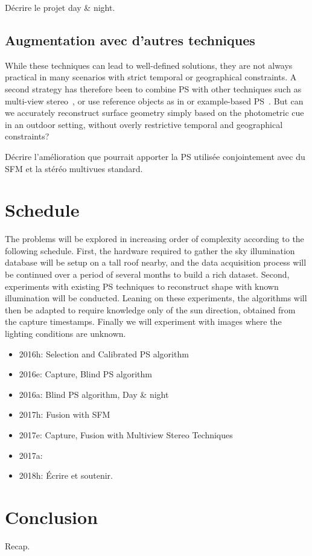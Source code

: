 \documentclass{report}
\begin{document}
Décrire le projet day \& night.

\section{Augmentation avec d'autres techniques}

While these techniques can lead to well-defined solutions, they are not always practical in many scenarios with strict temporal or geographical constraints. A second strategy has therefore been to combine PS with other techniques such as multi-view stereo~\cite{inose-tcva-13,shi-3dv-14}, or use reference objects as in \cite{johnson-cvpr-11} or example-based PS~\cite{hertzmann-pami-05,ackermann-3dv-14}. But can we accurately reconstruct surface geometry simply based on the photometric cue in an outdoor setting, without overly restrictive temporal and geographical constraints?

Décrire l'amélioration que pourrait apporter la PS utilisée conjointement avec du SFM et la stéréo multivues standard.


\chapter{Schedule}

The problems will be explored in increasing order of complexity according to the following schedule. First, the hardware required to gather the sky illumination database will be setup on a tall roof nearby, and the data acquisition process will be continued over a period of several months to build a rich dataset. Second, experiments with existing PS techniques to reconstruct shape with known illumination will be conducted. Leaning on these experiments, the algorithms will then be adapted to require knowledge only of the sun direction, obtained from the capture timestamps. Finally we will experiment with images where the lighting conditions are unknown.

\begin{itemize}
	\item 2016h: Selection and Calibrated PS algorithm
	\item 2016e: Capture, Blind PS algorithm
	\item 2016a: Blind PS algorithm, Day \& night
	\item 2017h: Fusion with SFM
	\item 2017e: Capture, Fusion with Multiview Stereo Techniques
	\item 2017a:
	\item 2018h: Écrire et soutenir.
\end{itemize}


\chapter{Conclusion}\label{conclusion}

Recap.


{\small


}
\end{document}
